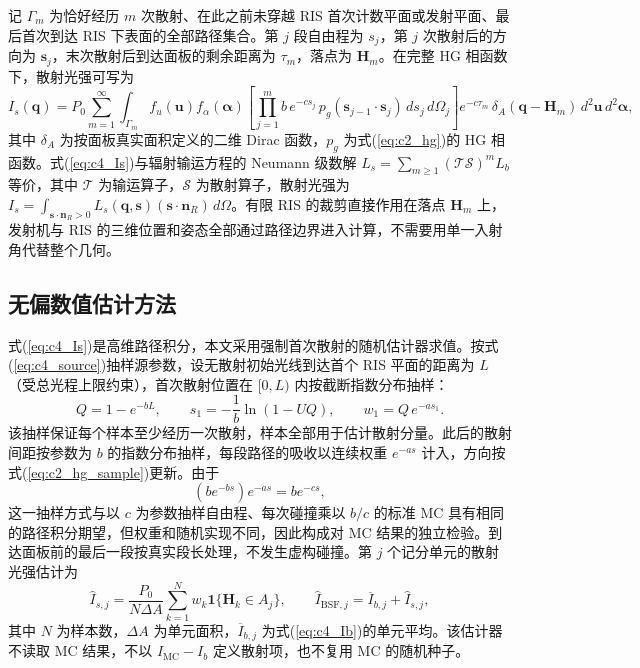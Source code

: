 记 $\Gamma_m$ 为恰好经历 $m$ 次散射、在此之前未穿越 RIS 首次计数平面或发射平面、最后首次到达 RIS 下表面的全部路径集合。第 $j$ 段自由程为 $s_j$，第 $j$ 次散射后的方向为 $\mathbf s_j$，末次散射后到达面板的剩余距离为 $\tau_m$，落点为 $\mathbf H_m$。在完整 HG 相函数下，散射光强可写为
\begin{equation}
I_s(\mathbf q)=P_0\sum_{m=1}^{\infty}\int_{\Gamma_m}f_u(\mathbf u)f_\alpha(\boldsymbol\alpha)
\left[\prod_{j=1}^{m}b\,e^{-cs_j}\,p_g(\mathbf s_{j-1}\cdot\mathbf s_j)\,ds_j\,d\Omega_j\right]
e^{-c\tau_m}\,\delta_A(\mathbf q-\mathbf H_m)\,d^2\mathbf u\,d^2\boldsymbol\alpha,
\label{eq:c4_Is}
\end{equation}
其中 $\delta_A$ 为按面板真实面积定义的二维 Dirac 函数，$p_g$ 为式(\ref{eq:c2_hg})的 HG 相函数。式(\ref{eq:c4_Is})与辐射输运方程的 Neumann 级数解 $L_s=\sum_{m\ge1}(\mathcal T\mathcal S)^mL_b$ 等价，其中 $\mathcal T$ 为输运算子，$\mathcal S$ 为散射算子，散射光强为 $I_s=\int_{\mathbf s\cdot\mathbf n_R>0}L_s(\mathbf q,\mathbf s)(\mathbf s\cdot\mathbf n_R)\,d\Omega$。有限 RIS 的裁剪直接作用在落点 $\mathbf H_m$ 上，发射机与 RIS 的三维位置和姿态全部通过路径边界进入计算，不需要用单一入射角代替整个几何。

\subsection{无偏数值估计方法}

式(\ref{eq:c4_Is})是高维路径积分，本文采用强制首次散射的随机估计器求值。按式(\ref{eq:c4_source})抽样源参数，设无散射初始光线到达首个 RIS 平面的距离为 $L$（受总光程上限约束），首次散射位置在 $[0,L)$ 内按截断指数分布抽样：
\begin{equation}
Q=1-e^{-bL},\qquad s_1=-\frac1b\ln(1-UQ),\qquad w_1=Q\,e^{-as_1}.
\label{eq:c4_forced}
\end{equation}
该抽样保证每个样本至少经历一次散射，样本全部用于估计散射分量。此后的散射间距按参数为 $b$ 的指数分布抽样，每段路径的吸收以连续权重 $e^{-as}$ 计入，方向按式(\ref{eq:c2_hg_sample})更新。由于
\begin{equation}
\left(be^{-bs}\right)e^{-as}=be^{-cs},
\label{eq:c4_equiv}
\end{equation}
这一抽样方式与以 $c$ 为参数抽样自由程、每次碰撞乘以 $b/c$ 的标准 MC 具有相同的路径积分期望，但权重和随机实现不同，因此构成对 MC 结果的独立检验。到达面板前的最后一段按真实段长处理，不发生虚构碰撞。第 $j$ 个记分单元的散射光强估计为
\begin{equation}
\widehat I_{s,j}=\frac{P_0}{N\Delta A}\sum_{k=1}^{N}w_k\mathbf 1\{\mathbf H_k\in A_j\},\qquad
\widehat I_{\mathrm{BSF},j}=\overline I_{b,j}+\widehat I_{s,j},
\label{eq:c4_estimator}
\end{equation}
其中 $N$ 为样本数，$\Delta A$ 为单元面积，$\overline I_{b,j}$ 为式(\ref{eq:c4_Ib})的单元平均。该估计器不读取 MC 结果，不以 $I_{\mathrm{MC}}-I_b$ 定义散射项，也不复用 MC 的随机种子。

